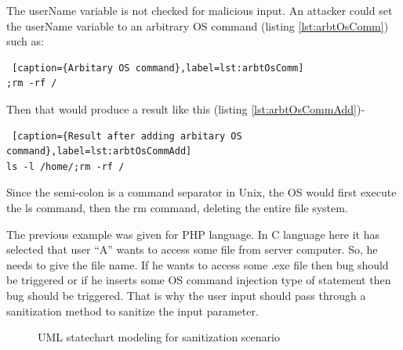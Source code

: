 The userName variable is not checked for malicious input. An attacker could set the userName variable to an arbitrary OS command (listing \ref{lst:arbtOsComm}) such as:
\begin{lstlisting} [caption={Arbitary OS command},label=lst:arbtOsComm]
;rm -rf /
\end{lstlisting}
Then that would produce a result like this (listing \ref{lst:arbtOsCommAdd})-
\begin{lstlisting} [caption={Result after adding arbitary OS command},label=lst:arbtOsCommAdd]
ls -l /home/;rm -rf /
\end{lstlisting}
Since the semi-colon is a command separator in Unix, the OS would first execute the ls command, then the rm command, deleting the entire file system.

The previous example was given for PHP language. In C language here it has selected that user \enquote{A} wants to access some file from server computer. So, he needs to give the file name. If he wants to access some .exe file then bug should be triggered or if he inserts some OS command injection type of statement then bug should be triggered. That is why the user input should pass through a sanitization method to sanitize the input parameter.

\begin{figure}[htbp]
	\centering
	\label{fig:sanitization_scenario}
	\caption{UML statechart modeling for sanitization scenario}
\end{figure}

